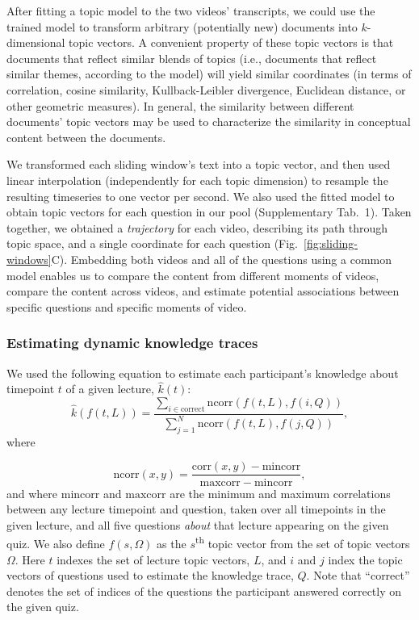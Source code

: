 \documentclass[10pt]{article}
\newcommand{\questions}{1}
\begin{document}
After fitting a topic model to the two videos' transcripts, we could use the
trained model to transform arbitrary (potentially new) documents into
$k$-dimensional topic vectors. A convenient property of these topic vectors is
that documents that reflect similar blends of topics (i.e., documents that
reflect similar themes, according to the model) will yield similar coordinates
(in terms of correlation, cosine similarity, Kullback-Leibler divergence, Euclidean distance, or other geometric measures). In
general, the similarity between different documents' topic vectors may be used
to characterize the similarity in conceptual content between the documents.

We transformed each sliding window's text into a topic vector, and then used
linear interpolation (independently for each topic dimension) to resample the
resulting timeseries to one vector per second. We also used the fitted model to
obtain topic vectors for each question in our pool (Supplementary Tab.~\questions). Taken
together, we obtained a \textit{trajectory} for each video, describing its path
through topic space, and a single coordinate for each question
(Fig.~\ref{fig:sliding-windows}C). Embedding both videos and all of the
questions using a common model enables us to compare the content from different
moments of videos, compare the content across videos, and estimate potential
associations between specific questions and specific moments of video.


\subsubsection*{Estimating dynamic knowledge traces}\label{subsec:traces}

We used the following equation to estimate each participant's knowledge about
timepoint $t$ of a given lecture, $\hat{k}(t)$:
\begin{equation}
    \hat{k}\left(f(t, L)\right) = \frac{\sum_{i \in \mathrm{correct}}\mathrm{ncorr}\left(f(t, L), f(i, Q)\right)}{\sum_{j = 1}^N \mathrm{ncorr}\left(f(t, L), f(j, Q)\right)},
    \label{eqn:prop}
\end{equation}
where

\begin{equation}
    \mathrm{ncorr}(x, y) = \frac{\mathrm{corr}(x, y) - \mathrm{mincorr}}{\mathrm{maxcorr} - \mathrm{mincorr}},
\end{equation}
and where $\mathrm{mincorr}$ and $\mathrm{maxcorr}$ are the minimum and maximum
correlations between any lecture timepoint and question, taken over all
timepoints in the given lecture, and all five questions \textit{about} that lecture appearing on the given quiz. 
We also define $f(s, \Omega)$ as the
$s$\textsuperscript{th} topic vector from the set of topic vectors $\Omega$.
Here $t$ indexes the set of lecture topic vectors, $L$, and $i$ and $j$ index
the topic vectors of questions used to estimate the knowledge trace, $Q$. Note
that ``correct'' denotes the set of indices of the questions the participant
answered correctly on the given quiz.
\end{document}
